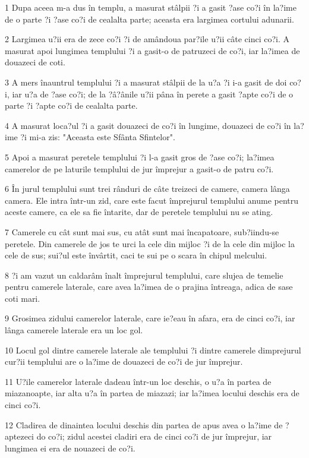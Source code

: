 \par 1 Dupa aceea m-a dus în templu, a masurat stâlpii ?i a gasit ?ase co?i în la?ime de o parte ?i ?ase co?i de cealalta parte; aceasta era largimea cortului adunarii.
\par 2 Largimea u?ii era de zece co?i ?i de amândoua par?ile u?ii câte cinci co?i. A masurat apoi lungimea templului ?i a gasit-o de patruzeci de co?i, iar la?imea de douazeci de coti.
\par 3 A mers înauntrul templului ?i a masurat stâlpii de la u?a ?i i-a gasit de doi co?i, iar u?a de ?ase co?i; de la ?â?ânile u?ii pâna în perete a gasit ?apte co?i de o parte ?i ?apte co?i de cealalta parte.
\par 4 A masurat loca?ul ?i a gasit douazeci de co?i în lungime, douazeci de co?i în la?ime ?i mi-a zis: "Aceasta este Sfânta Sfintelor".
\par 5 Apoi a masurat peretele templului ?i l-a gasit gros de ?ase co?i; la?imea camerelor de pe laturile templului de jur împrejur a gasit-o de patru co?i.
\par 6 În jurul templului sunt trei rânduri de câte treizeci de camere, camera lânga camera. Ele intra într-un zid, care este facut împrejurul templului anume pentru aceste camere, ca ele sa fie întarite, dar de peretele templului nu se ating.
\par 7 Camerele cu cât sunt mai sus, cu atât sunt mai încapatoare, sub?iindu-se peretele. Din camerele de jos te urci la cele din mijloc ?i de la cele din mijloc la cele de sus; sui?ul este învârtit, caci te sui pe o scara în chipul melcului.
\par 8 ?i am vazut un caldarâm înalt împrejurul templului, care slujea de temelie pentru camerele laterale, care avea la?imea de o prajina întreaga, adica de sase coti mari.
\par 9 Grosimea zidului camerelor laterale, care ie?eau în afara, era de cinci co?i, iar lânga camerele laterale era un loc gol.
\par 10 Locul gol dintre camerele laterale ale templului ?i dintre camerele dimprejurul cur?ii templului are o la?ime de douazeci de co?i de jur împrejur.
\par 11 U?ile camerelor laterale dadeau într-un loc deschis, o u?a în partea de miazanoapte, iar alta u?a în partea de miazazi; iar la?imea locului deschis era de cinci co?i.
\par 12 Cladirea de dinaintea locului deschis din partea de apus avea o la?ime de ?aptezeci do co?i; zidul acestei cladiri era de cinci co?i de jur împrejur, iar lungimea ei era de nouazeci de co?i.
